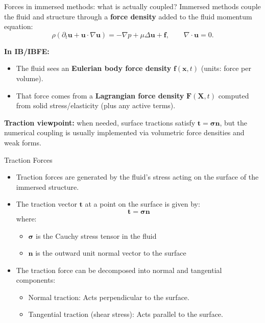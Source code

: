 \documentclass{beamer}
\begin{document}
\begin{frame}{Forces in immersed methods: what is actually coupled?}
\small
Immersed methods couple the fluid and structure through a \textbf{force density} added to the fluid momentum equation:
\[
\rho\left(\partial_t\bm{u}+\bm{u}\cdot\nabla\bm{u}\right) = -\nabla p + \mu\Delta \bm{u} + \bm{f},
\qquad \nabla\cdot\bm{u}=0.
\]

\medskip
\textbf{In IB/IBFE:}
\begin{itemize}
  \item The fluid sees an \textbf{Eulerian body force density} \(\bm{f}(\bm{x},t)\) (units: force per volume).
  \item That force comes from a \textbf{Lagrangian force density} \(\bm{F}(\bm{X},t)\) computed from solid stress/elasticity (plus any active terms).
\end{itemize}

\medskip
\textbf{Traction viewpoint:} when needed, surface tractions satisfy \(\bm{t}=\boldsymbol{\sigma}\bm{n}\),
but the numerical coupling is usually implemented via volumetric force densities and weak forms.
\end{frame}


\begin{frame}{Traction Forces}
    \begin{itemize}
        \item Traction forces are generated by the fluid's stress acting on the surface of the immersed structure.
        \item The traction vector $\mathbf{t}$ at a point on the surface is given by:
        \begin{equation*}
        \mathbf{t} = \boldsymbol{\sigma} \mathbf{n}
        \end{equation*}
        where:
        \begin{itemize}
            \item $\boldsymbol{\sigma}$ is the Cauchy stress tensor in the fluid
            \item $\mathbf{n}$ is the outward unit normal vector to the surface
        \end{itemize}
        \item The traction force can be decomposed into normal and tangential components:
        \begin{itemize}
            \item Normal traction: Acts perpendicular to the surface.
            \item Tangential traction (shear stress): Acts parallel to the surface.
        \end{itemize}
    \end{itemize}
\end{frame}
\end{document}
